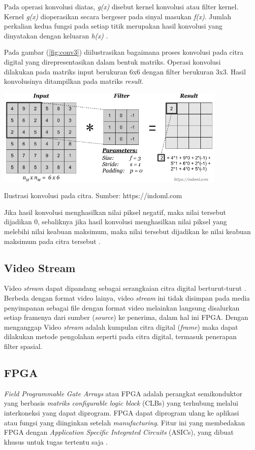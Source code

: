 Pada operasi konvolusi diatas, \textit{g(x)} disebut kernel konvolusi atau filter kernel. Kernel \textit{g(x)} dioperasikan secara bergeser pada sinyal masukan \textit{f(x)}. Jumlah perkalian kedua fungsi pada setiap titik merupakan hasil konvolusi yang dinyatakan dengan keluaran \textit{h(x)} \cite{book:munir}. 

Pada gambar (\ref{fig:conv3}) diilustrasikan bagaimana proses konvolusi pada citra digital yang direpresentasikan dalam bentuk matriks. Operasi konvolusi dilakukan pada matriks input berukuran 6x6 dengan filter berukuran 3x3. Hasil konvolusinya ditampilkan pada matriks \textit{result}.
\begin{afigure}
    \includegraphics[width=0.85\textwidth, center]{images/convolution-operation.png}
    \caption{Ilustrasi konvolusi pada citra. Sumber: https://indoml.com}
    \label{fig:conv3}
\end{afigure}

Jika hasil konvolusi menghasilkan nilai piksel negatif, maka nilai tersebut dijadikan 0, sebaliknya jika hasil konvolusi menghasilkan nilai piksel yang melebihi nilai keabuan maksimum, maka nilai tersebut dijadikan ke nilai keabuan maksimum pada citra tersebut \cite{book:sutoyo}.
 

\subsection{Video Stream}
Video \textit{stream} dapat dipandang sebagai serangkaian citra digital berturut-turut \cite{thesis:jin}. Berbeda dengan format video lainya, video \textit{stream} ini tidak disimpan pada media penyimpanan sebagai file dengan format video melainkan langsung disalurkan setiap framenya dari sumber (\textit{source}) ke penerima, dalam hal ini FPGA.  Dengan menganggap Video \textit{stream} adalah kumpulan citra digital (\textit{frame}) maka dapat dilakukan metode pengolahan seperti pada citra digital, termasuk penerapan filter spasial. 


\subsection{FPGA}
\textit{Field Programmable Gate Arrays} atau FPGA adalah perangkat semikonduktor yang berbasis \textit{matriks configurable logic block} (CLBs) yang terhubung melalui interkoneksi yang dapat diprogram. FPGA dapat diprogram ulang ke aplikasi atau fungsi yang diinginkan setelah \textit{manufacturing}. Fitur ini yang membedakan FPGA dengan \textit{Application Specific Integrated Circuits} (ASICs), yang dibuat khusus untuk tugas tertentu saja \cite{XILINX}.

